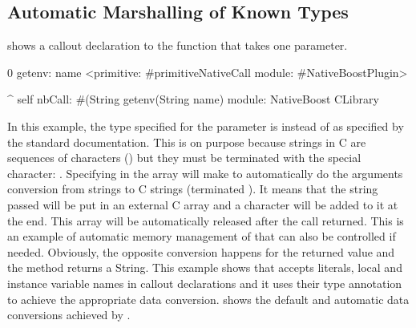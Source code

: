 \subsection{Automatic Marshalling of Known Types}

 shows a callout declaration to the  function that takes one parameter.
%
\begin{stcode}[
	label={lst:ffi-getenv},
	caption={Example of callout to \ttt{getenv}}]{0}
getenv: name
	<primitive: #primitiveNativeCall
	 module: #NativeBoostPlugin>

	^ self
		nbCall: #(String getenv(String name)
		module: NativeBoost CLibrary
\end{stcode}
%
In this example, the \NB type specified for the parameter is  instead of  as specified by the standard  documentation.
This is on purpose because strings in C are sequences of characters () but they must be terminated with the special character: \cnull.
Specifying  in the  array will make \NB to automatically do the arguments conversion from \ST strings to C strings (\cnull terminated ).
It means that the string passed will be put in an external C  array and a \cnull character will be added to it at the end.
This array will be automatically released after the call returned.
This is an example of automatic memory management of \NB that can also be controlled if needed.
Obviously, the opposite conversion happens for the returned value and the method returns a \ST String.
This example shows that \NBFFI accepts literals, local and instance variable names in callout declarations and it uses their type annotation to achieve the appropriate data conversion.
 shows the default and automatic data conversions achieved by \NBFFI.


